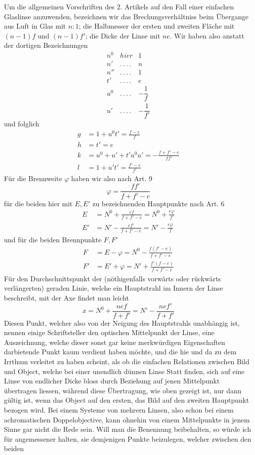 Um die allgemeinen Vorschriften des 2. Artikels auf den Fall einer einfachen Glaslinse anzuwenden, bezeichnen wir das Brechungsverhältniss beim Übergange aus Luft in Glas mit $n:1$; die Halbmesser der ersten und zweiten Fläche mit $(n-1)f$ und $(n-1)f'$; die Dicke der Linse mit $ne$. Wir haben also anstatt der dortigen Bezeichnungen
\[
\begin{array}{ccc}
n^0&\mathit{hier}&1\\
n'&.\,.\,.\,.&n\\
n''&.\,.\,.\,.&1\\
t'&.\,.\,.\,.&e\\
u^0&.\,.\,.\,.&-\dfrac1f\\
u'&.\,.\,.\,.&-\dfrac1{f'}
\end{array}
\]
und folglich
\[
\begin{aligned}
g&=1+u^0t'=\frac{f-e}{f}\\
h&=t'=e\\
k&=u^0+u'+t'u^0u'=-\frac{f+f'-e}{ff'}\\
l&=1+u't'=\frac{f'-e}{f'}
\end{aligned}
\]
Für die Brennweite $\varphi$ haben wir also nach Art. 9
\[
\varphi=\frac{ff'}{f+f'-e}
\]
für die beiden hier mit $E,E'$ zu bezeichnenden Hauptpunkte nach Art. 6
\[
\begin{aligned}
E&=N^0+\frac{ef}{f+f'-e}=N^0+\frac{e\varphi}{f'}\\
E'&=N'-\frac{ef'}{f+f'-e}=N'-\frac{e\varphi}{f}
\end{aligned}
\]
und für die beiden Brennpunkte $F,F'$
\[
\begin{aligned}
F&=E-\varphi=N^0-\frac{f(f'-e)}{f+f'-e}\\
F'&=E'+\varphi=N'+\frac{f'(f-e)}{f+f'-e}
\end{aligned}
\]
Für den Durchschnittspunkt der (nöthigenfalls vorwärts oder rückwärts verlängerten) geraden Linie, welche ein Hauptstrahl im Innern der Linse beschreibt, mit der Axe findet man leicht
\[
x=N^0+\frac{nef}{f+f'}=N'-\frac{nef'}{f+f'}
\]
Diesen Punkt, welcher also von der Neigung des Hauptstrahls unabhängig ist, nennen einige Schriftsteller den optischen Mittelpunkt der Linse, eine Auszeichnung, welche dieser sonst gar keine merkwürdigen Eigenschaften darbietende Punkt kaum verdient haben möchte, und die hie und da zu dem Irrthum verleitet zu haben scheint, als ob die einfachen Relationen zwischen Bild und Object, welche bei einer unendlich dünnen Linse Statt finden, sich auf eine Linse von endlicher Dicke bloss durch Beziehung auf jenen Mittelpunkt übertragen liessen, während diese Übertragung, wie oben gezeigt ist, nur dann gültig ist, wenn das Object auf den ersten, das Bild auf den zweiten Hauptpunkt bezogen wird. Bei einem Systeme von mehrern Linsen, also schon bei einem achromatischen Doppelobjective, kann ohnehin von einem Mittelpunkte in jenem Sinne gar nicht die Rede sein. Will man die Benennung beibehalten, so würde ich für angemessener halten, sie demjenigen Punkte beizulegen, welcher zwischen den beiden
